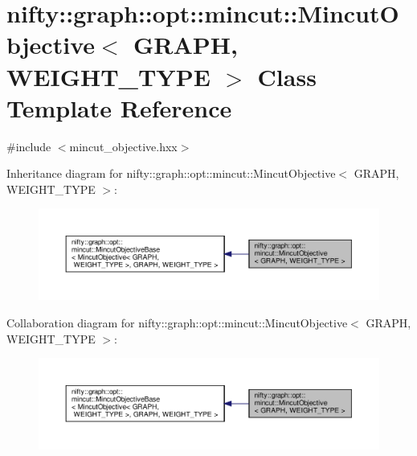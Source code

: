 \hypertarget{classnifty_1_1graph_1_1opt_1_1mincut_1_1MincutObjective}{}\section{nifty\+:\+:graph\+:\+:opt\+:\+:mincut\+:\+:Mincut\+Objective$<$ G\+R\+A\+PH, W\+E\+I\+G\+H\+T\+\_\+\+T\+Y\+PE $>$ Class Template Reference}
\label{classnifty_1_1graph_1_1opt_1_1mincut_1_1MincutObjective}


{\ttfamily \#include $<$mincut\+\_\+objective.\+hxx$>$}



Inheritance diagram for nifty\+:\+:graph\+:\+:opt\+:\+:mincut\+:\+:Mincut\+Objective$<$ G\+R\+A\+PH, W\+E\+I\+G\+H\+T\+\_\+\+T\+Y\+PE $>$\+:
\nopagebreak
\begin{figure}[H]
\begin{center}
\leavevmode
\includegraphics[width=350pt]{classnifty_1_1graph_1_1opt_1_1mincut_1_1MincutObjective__inherit__graph}
\end{center}
\end{figure}


Collaboration diagram for nifty\+:\+:graph\+:\+:opt\+:\+:mincut\+:\+:Mincut\+Objective$<$ G\+R\+A\+PH, W\+E\+I\+G\+H\+T\+\_\+\+T\+Y\+PE $>$\+:
\nopagebreak
\begin{figure}[H]
\begin{center}
\leavevmode
\includegraphics[width=350pt]{classnifty_1_1graph_1_1opt_1_1mincut_1_1MincutObjective__coll__graph}
\end{center}
\end{figure}
